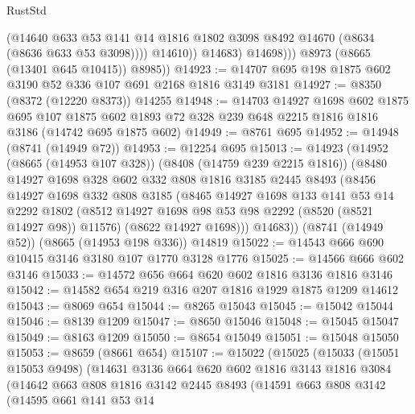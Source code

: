 \begin{lexlean}{RustStd}
\begin{coremodule}
                      (@14640
                        @633
                        @53
                        @141
                        @14
                        @1816
                        @1802
                        @3098
                        @8492
                        @14670
                        (@8634 (@8636 @633 @53 @3098))))
                    @14610))
                @14683)
              @14698)))
        @8973
        (@8665 (@13401 @645 @10415))
        @8985))
@14923 := @14707 @695 @198 @1875 @602 @3190 @52 @336 @107 @691 @2168 @1816 @3149 @3181
@14927 := @8350 (@8372 (@12220 @8373)) @14255
@14948 := @14703
    @14927
    @1698
    @602
    @1875
    @695
    @107
    @1875
    @602
    @1893
    @72
    @328
    @239
    @648
    @2215
    @1816
    @1816
    @3186
    (@14742 @695 @1875 @602)
@14949 := @8761 @695
@14952 := @14948 (@8741 (@14949 @72))
@14953 := @12254 @695
@15013 := @14923
    (@14952
      (@8665 (@14953 @107 @328))
      (@8408 (@14759 @239 @2215 @1816))
      (@8480
        @14927
        @1698
        @328
        @602
        @332
        @808
        @1816
        @3185
        @2445
        @8493
        (@8456
          @14927
          @1698
          @332
          @808
          @3185
          (@8465
            @14927
            @1698
            @133
            @141
            @53
            @14
            @2292
            @1802
            (@8512 @14927 @1698 @98 @53 @98 @2292 (@8520 (@8521 @14927 @98)) @11576)
            (@8622 @14927 @1698)))
        @14683))
    (@8741 (@14949 @52))
    (@8665 (@14953 @198 @336))
    @14819
@15022 := @14543 @666 @690 @10415 @3146 @3180 @107 @1770 @3128 @1776
@15025 := @14566 @666 @602 @3146
@15033 := @14572 @656 @664 @620 @602 @1816 @3136 @1816 @3146
@15042 := @14582 @654 @219 @316 @207 @1816 @1929 @1875 @1209 @14612
@15043 := @8069 @654
@15044 := @8265 @15043
@15045 := @15042 @15044
@15046 := @8139 @1209
@15047 := @8650 @15046
@15048 := @15045 @15047
@15049 := @8163 @1209
@15050 := @8654 @15049
@15051 := @15048 @15050
@15053 := @8659 (@8661 @654)
@15107 := @15022
    (@15025
      (@15033
        (@15051 @15053 @9498)
        (@14631
          @3136
          @664
          @620
          @602
          @1816
          @3143
          @1816
          @3084
          (@14642
            @663
            @808
            @1816
            @3142
            @2445
            @8493
            (@14591
              @663
              @808
              @3142
              (@14595
                @661
                @141
                @53
                @14

\end{coremodule}
\end{lexlean}
